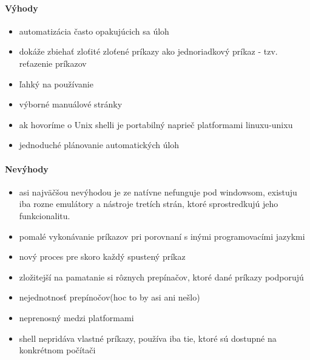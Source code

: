 \paragraph{Výhody}
\begin{itemize}
	\item automatizácia často opakujúcich sa úloh
	\item dokáže zbiehať zloťité zloťené príkazy ako jednoriadkový príkaz  - tzv. reťazenie príkazov
	\item ľahký na používanie
	\item výborné manuálové stránky
	\item ak hovoríme o Unix shelli je portabilný naprieč platformami linuxu-unixu
	\item jednoduché plánovanie automatických úloh
	\newline
\end{itemize}
\paragraph{Nevýhody}
\begin{itemize}
	\item asi najväčšou nevýhodou je ze natívne nefunguje pod windowsom, existuju iba rozne emulátory a nástroje tretích strán, ktoré sprostredkujú jeho funkcionalitu.
	\item pomalé vykonávanie príkazov pri porovnaní s inými programovacími jazykmi
	\item nový proces pre skoro každý spustený príkaz
	\item zložitejší na pamatanie si rôznych prepínačov, ktoré dané príkazy podporujú
	\item nejednotnosť prepínočov(hoc to by asi ani nešlo)
	\item neprenosný medzi platformami
	\item shell nepridáva vlastné príkazy, používa iba tie, ktoré sú dostupné na konkrétnom počítači
\end{itemize}
